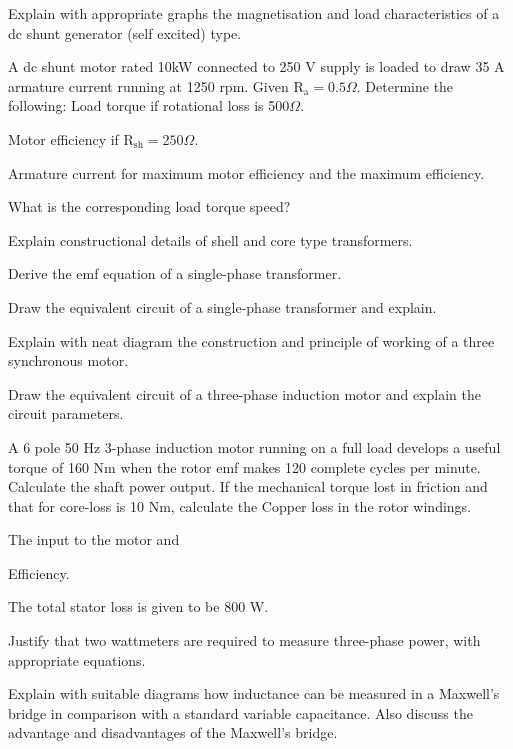\markB
\partCo

\item \iitem Explain with appropriate graphs the magnetisation and load characteristics of a dc shunt 
  generator (self excited) type.
\Or
\item A dc shunt motor rated 10kW connected to 250 V supply is loaded to draw 35 A armature current 
  running at 1250 rpm. Given R$_\text{a} = 0.5 \Omega$. Determine the following:
\iitem Load torque if rotational loss is 500$ \Omega$.
\item Motor efficiency if R$_\text{sh} = 250 \Omega$.
\item Armature current for maximum motor efficiency and the maximum efficiency.
\ene

What is the corresponding load torque speed? 
\ene

\item \iitem Explain constructional details of shell and core type transformers.
\Or
\item \iitem Derive the emf equation of a single-phase transformer. 
\item Draw the equivalent circuit of a single-phase transformer and explain. 
\ene\ene

\item \iitem Explain with neat diagram the construction and principle of working of a three synchronous
  motor.
\Or
\item \iitem Draw the equivalent circuit of a three-phase induction motor and explain the circuit parameters.
\item A 6 pole 50 Hz 3-phase induction motor running on a full load develops a useful torque
  of 160 Nm when the rotor emf makes 120 complete cycles per minute. Calculate the shaft power output.
  If the mechanical torque lost in friction and that for core-loss is 10 Nm, calculate the
\iitem Copper loss in the rotor windings.
\item The input to the motor and
\item Efficiency.
\ene

The total stator loss is given to be 800 W.
\ene\ene

\item \iitem Justify that two wattmeters are required to measure three-phase power, with appropriate equations.

\item Explain with suitable diagrams how inductance can be measured in a Maxwell's bridge in comparison with a 
  standard variable capacitance. Also discuss the advantage and disadvantages of the Maxwell's bridge.
\ene

\markC
\ene
